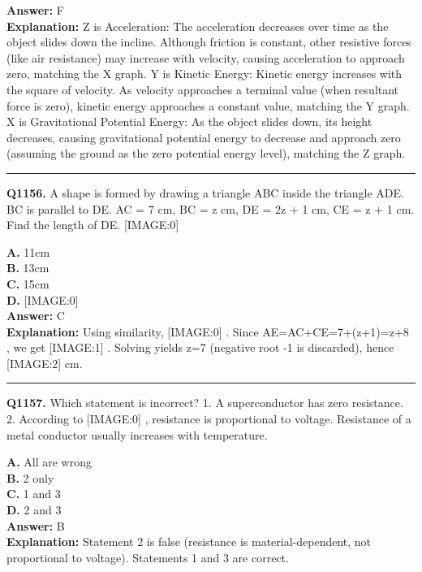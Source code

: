\documentclass[12pt]{article}
\begin{document}
\textbf{Answer:} F \\
\textbf{Explanation:} Z is Acceleration: The acceleration decreases over time as the object slides down the incline. Although friction is constant, other resistive forces (like air resistance) may increase with velocity, causing acceleration to approach zero, matching the X graph.
Y is Kinetic Energy: Kinetic energy increases with the square of velocity. As velocity approaches a terminal value (when resultant force is zero), kinetic energy approaches a constant value, matching the Y graph.
X is Gravitational Potential Energy: As the object slides down, its height decreases, causing gravitational potential energy to decrease and approach zero (assuming the ground as the zero potential energy level), matching the Z graph.

\hrule
\vspace{1em}


\noindent
\textbf{Q1156.} A shape is formed by drawing a triangle ABC inside the triangle ADE. BC is parallel to DE. AC = 7 cm, BC = z cm, DE = 2z + 1 cm, CE = z + 1 cm.
Find the length of DE.
[IMAGE:0]



\textbf{A.} 11cm \\
\textbf{B.} 13cm \\
\textbf{C.} 15cm \\
\textbf{D.} [IMAGE:0] \\

\textbf{Answer:} C \\
\textbf{Explanation:} Using similarity,
[IMAGE:0]
. Since AE=AC+CE=7+(z+1)=z+8
, we get
[IMAGE:1]
. Solving yields z=7
(negative root -1 is discarded), hence
[IMAGE:2]
cm.

\hrule
\vspace{1em}


\noindent
\textbf{Q1157.} Which statement is incorrect?
1.
A superconductor has zero resistance.
2.
According to
[IMAGE:0]
, resistance is proportional to voltage.
Resistance of a metal conductor usually increases with temperature.



\textbf{A.} All are wrong \\
\textbf{B.} 2 only \\
\textbf{C.} 1 and 3 \\
\textbf{D.} 2 and 3 \\

\textbf{Answer:} B \\
\textbf{Explanation:} Statement 2 is false (resistance is material-dependent, not proportional to voltage). Statements 1 and 3 are correct.
\end{document}
